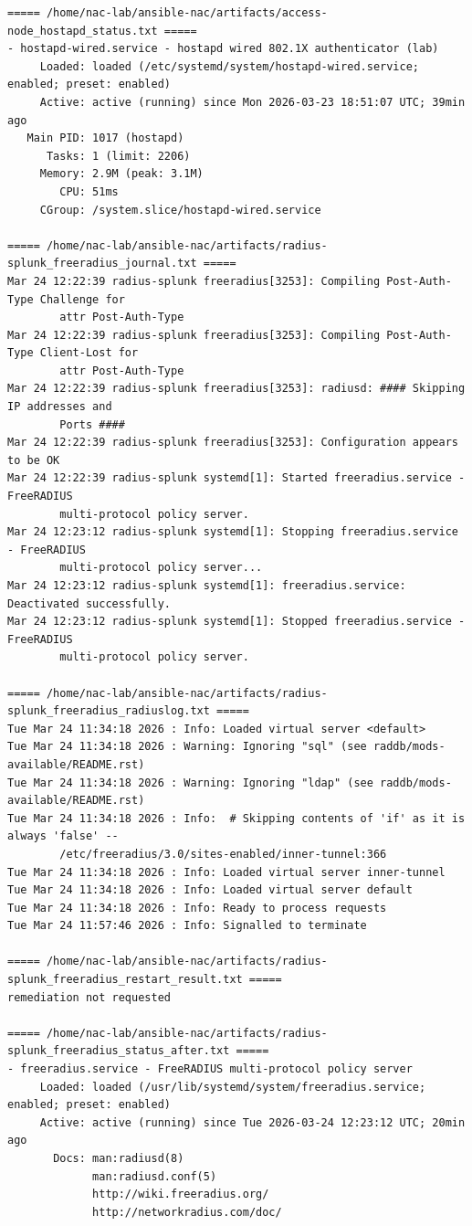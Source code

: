 \documentclass[11pt]{article}
\begin{document}
\begin{verbatim}
===== /home/nac-lab/ansible-nac/artifacts/access-node_hostapd_status.txt =====
- hostapd-wired.service - hostapd wired 802.1X authenticator (lab)
     Loaded: loaded (/etc/systemd/system/hostapd-wired.service; enabled; preset: enabled)
     Active: active (running) since Mon 2026-03-23 18:51:07 UTC; 39min ago
   Main PID: 1017 (hostapd)
      Tasks: 1 (limit: 2206)
     Memory: 2.9M (peak: 3.1M)
        CPU: 51ms
     CGroup: /system.slice/hostapd-wired.service

===== /home/nac-lab/ansible-nac/artifacts/radius-splunk_freeradius_journal.txt =====
Mar 24 12:22:39 radius-splunk freeradius[3253]: Compiling Post-Auth-Type Challenge for 
        attr Post-Auth-Type
Mar 24 12:22:39 radius-splunk freeradius[3253]: Compiling Post-Auth-Type Client-Lost for 
        attr Post-Auth-Type
Mar 24 12:22:39 radius-splunk freeradius[3253]: radiusd: #### Skipping IP addresses and 
        Ports ####
Mar 24 12:22:39 radius-splunk freeradius[3253]: Configuration appears to be OK
Mar 24 12:22:39 radius-splunk systemd[1]: Started freeradius.service - FreeRADIUS 
        multi-protocol policy server.
Mar 24 12:23:12 radius-splunk systemd[1]: Stopping freeradius.service - FreeRADIUS 
        multi-protocol policy server...
Mar 24 12:23:12 radius-splunk systemd[1]: freeradius.service: Deactivated successfully.
Mar 24 12:23:12 radius-splunk systemd[1]: Stopped freeradius.service - FreeRADIUS 
        multi-protocol policy server.

===== /home/nac-lab/ansible-nac/artifacts/radius-splunk_freeradius_radiuslog.txt =====
Tue Mar 24 11:34:18 2026 : Info: Loaded virtual server <default>
Tue Mar 24 11:34:18 2026 : Warning: Ignoring "sql" (see raddb/mods-available/README.rst)
Tue Mar 24 11:34:18 2026 : Warning: Ignoring "ldap" (see raddb/mods-available/README.rst)
Tue Mar 24 11:34:18 2026 : Info:  # Skipping contents of 'if' as it is always 'false' -- 
        /etc/freeradius/3.0/sites-enabled/inner-tunnel:366
Tue Mar 24 11:34:18 2026 : Info: Loaded virtual server inner-tunnel
Tue Mar 24 11:34:18 2026 : Info: Loaded virtual server default
Tue Mar 24 11:34:18 2026 : Info: Ready to process requests
Tue Mar 24 11:57:46 2026 : Info: Signalled to terminate

===== /home/nac-lab/ansible-nac/artifacts/radius-splunk_freeradius_restart_result.txt =====
remediation not requested

===== /home/nac-lab/ansible-nac/artifacts/radius-splunk_freeradius_status_after.txt =====
- freeradius.service - FreeRADIUS multi-protocol policy server
     Loaded: loaded (/usr/lib/systemd/system/freeradius.service; enabled; preset: enabled)
     Active: active (running) since Tue 2026-03-24 12:23:12 UTC; 20min ago
       Docs: man:radiusd(8)
             man:radiusd.conf(5)
             http://wiki.freeradius.org/
             http://networkradius.com/doc/


\end{verbatim}
\end{document}
